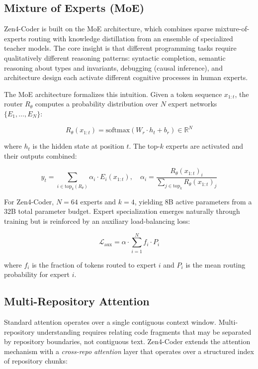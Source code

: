 \documentclass[11pt,a4paper]{article}
\begin{document}
\subsection{Mixture of Experts (MoE)}

Zen4-Coder is built on the MoE architecture, which combines sparse mixture-of-experts routing with knowledge distillation from an ensemble of specialized teacher models. The core insight is that different programming tasks require qualitatively different reasoning patterns: syntactic completion, semantic reasoning about types and invariants, debugging (causal inference), and architecture design each activate different cognitive processes in human experts.

The MoE architecture formalizes this intuition. Given a token sequence $x_{1:t}$, the router $R_\theta$ computes a probability distribution over $N$ expert networks $\{E_1, \ldots, E_N\}$:

\begin{equation}
  R_\theta(x_{1:t}) = \text{softmax}\left(W_r \cdot h_t + b_r\right) \in \mathbb{R}^N
\end{equation}

where $h_t$ is the hidden state at position $t$. The top-$k$ experts are activated and their outputs combined:

\begin{equation}
  y_t = \sum_{i \in \text{top}_k(R_\theta)} \alpha_i \cdot E_i(x_{1:t}), \quad \alpha_i = \frac{R_\theta(x_{1:t})_i}{\sum_{j \in \text{top}_k} R_\theta(x_{1:t})_j}
\end{equation}

For Zen4-Coder, $N = 64$ experts and $k = 4$, yielding 8B active parameters from a 32B total parameter budget. Expert specialization emerges naturally through training but is reinforced by an auxiliary load-balancing loss:

\begin{equation}
  \mathcal{L}_{\text{aux}} = \alpha \cdot \sum_{i=1}^{N} f_i \cdot P_i
\end{equation}

where $f_i$ is the fraction of tokens routed to expert $i$ and $P_i$ is the mean routing probability for expert $i$.

\subsection{Multi-Repository Attention}

Standard attention operates over a single contiguous context window. Multi-repository understanding requires relating code fragments that may be separated by repository boundaries, not contiguous text. Zen4-Coder extends the attention mechanism with a \emph{cross-repo attention} layer that operates over a structured index of repository chunks:
\end{document}
